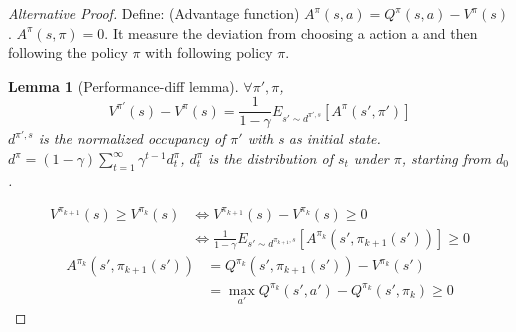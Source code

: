 \documentclass{report}
\newtheorem{lemma}[theorem]{Lemma}
\begin{document}
\begin{proof}[Alternative Proof]
    Define: (Advantage function) $A^{\pi}(s,a)=Q^{\pi}(s,a)-V^{\pi}(s)$. $A^{\pi}(s,\pi)=0$. It measure the deviation from choosing a action a and then following the policy $\pi$ with following policy $\pi$.
    \begin{lemma}[Performance-diff lemma\cite{Kakade2002ApproximatelyLearning}]
        $\forall \pi',\pi$, \[
            V^{\pi'}(s)-V^{\pi}(s)=\frac{1}{1-\gamma}E_{s'\sim d^{\pi',s}}[A^{\pi}(s',\pi')]
        \] 
        $d^{\pi',s}$ is the normalized occupancy of $\pi'$ with s as initial state.\\
        $d^{\pi}=(1-\gamma)\sum_{t=1}^{\infty}\gamma^{t-1}d^{\pi}_t$, $d^{\pi}_t$ is the distribution of $s_t$ under $\pi$, starting from $d_0$.
    \end{lemma}
    \begin{equation*}
    \begin{split}
                V^{\pi_{k+1}}(s) \geq V^{\pi_{k}}(s) &\Leftrightarrow  V^{\pi_{k+1}}(s) - V^{\pi_{k}}(s) \geq 0 \\
                & \Leftrightarrow \frac{1}{1-\gamma}E_{s' \sim d^{\pi_{k+1},s}}[A^{\pi_k}(s',\pi_{k+1}(s'))] \geq 0
    \end{split}
    \end{equation*}
    \begin{equation*}
        \begin{split}
            A^{\pi_k}(s',\pi_{k+1}(s')) &= Q^{\pi_k}(s',\pi_{k+1}(s'))-V^{\pi_k}(s') \\
            & = \max_{a'}Q^{\pi_k}(s',a')-Q^{\pi_k}(s',\pi_k) \geq 0
        \end{split}
    \end{equation*}

\end{proof}
\end{document}
